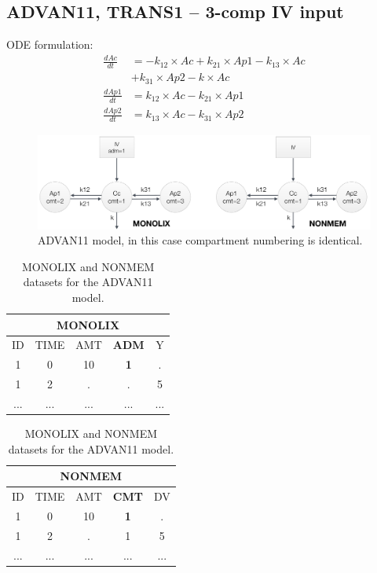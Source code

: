 \subsection{ADVAN11, TRANS1 -- 3-comp IV input}
\label{subsubsec:ADVAN11}
ODE formulation:
\begin{align} %
\frac{dAc}{dt} & =  - k_{12} \times Ac + k_{21} \times Ap1- k_{13} \times Ac \nonumber \\
			& + k_{31} \times Ap2 - k \times Ac  \nonumber \\
\frac{dAp1}{dt} & =  k_{12} \times Ac - k_{21} \times Ap1  \nonumber \\
\frac{dAp2}{dt} & =  k_{13} \times Ac - k_{31} \times Ap2  \nonumber
\end{align} 


\begin{figure}[htbp!]
\centering
 \includegraphics[width=160mm]{pics/Advan11}
\caption{ADVAN11 model, in this case compartment numbering is identical.}
\label{fig:Advan11}
\end{figure}


\begin{table}[ht!]
\footnotesize
\parbox{.5\linewidth}{
\centering
\begin{tabular}{ccccc}
  \hline
   \multicolumn{5}{c}{\textbf{MONOLIX}} \\
  \hline
ID & TIME & AMT & \textbf{ADM} & Y \\
  \hline
1  & 0        & 10   & \textbf{1} & .       \\
1  & 2        & .      & . 	& 5        \\
... &  ...      &  ...   &  ...   &  ...    \\
\end{tabular}
}
\hfill
\parbox{.5\linewidth}{
\centering
\begin{tabular}{ccccc}
  \hline
   \multicolumn{5}{c}{\textbf{NONMEM}} \\
  \hline
ID & TIME & AMT & \textbf{CMT} & DV \\
  \hline
1  & 0        & 10   & \textbf{1}   & .    \\
1  & 2        & .      & 1    & 5   \\
... &  ...      &  ...   &  ... & ...  \\
\end{tabular}
}
\caption{MONOLIX and NONMEM datasets for the ADVAN11 model.}
\end{table}



